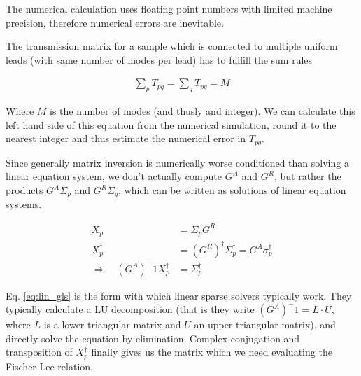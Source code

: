 The numerical
calculation uses floating point numbers with limited machine precision,
therefore numerical errors are inevitable.

The transmission matrix for a sample which is connected to multiple uniform
leads (with same number of modes per lead) has to fulfill the sum rules

\begin{align}
    \sum_p T_{pq} = \sum_q T_{pq} = M
    \label{eq:sumrule}
\end{align}

Where $M$ is the number of modes (and thusly and integer). We can calculate
this left hand side of this equation from the numerical simulation, round it
to the nearest integer and thus estimate the numerical error in $T_{pq}$.

Since generally matrix inversion is numerically worse conditioned than solving
a linear equation system\cite{matrixinversion}, we don't actually compute
$G^A$ and $G^R$, but rather the products $G^A\Sigma_p$ and $G^R\Sigma_q$,
which can be written as solutions of linear equation systems.

\begin{align}
    X_p &= \Sigma_p G^R\\
    X_p^\dagger &= (G^R)^\dagger \Sigma_p^\dagger = G^A \sigma_p^\dagger\\
    \Rightarrow\quad (G^A)^-1 X_p^\dagger &= \Sigma_p^\dagger
    \label{eq:lin_gls}
\end{align}

Eq. \ref{eq:lin_gls} is the form with which linear sparse solvers typically
work. They typically calculate a LU decomposition (that is they write
$(G^A)^-1 = L \cdot U$, where $L$ is a lower triangular matrix and $U$ an
upper triangular matrix), and directly solve the equation by elimination.
Complex conjugation and transposition of $X_p^\dagger$ finally gives us the
matrix which we need evaluating the Fischer-Lee relation.

